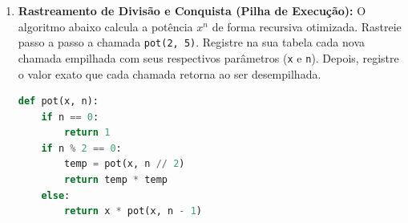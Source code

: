 \documentclass[10pt,a4paper]{article}
\begin{document}
\begin{enumerate}[leftmargin=*, itemsep=2pt, parsep=0pt, resume]
    \item \textbf{Rastreamento de Divisão e Conquista (Pilha de Execução):} O algoritmo abaixo calcula a potência $x^n$ de forma recursiva otimizada. Rastreie passo a passo a chamada \texttt{pot(2, 5)}. Registre na sua tabela cada nova chamada empilhada com seus respectivos parâmetros (\texttt{x} e \texttt{n}). Depois, registre o valor exato que cada chamada retorna ao ser desempilhada. 
\begin{lstlisting}[language=Python]
def pot(x, n):
    if n == 0:
        return 1
    if n % 2 == 0:
        temp = pot(x, n // 2)
        return temp * temp
    else:
        return x * pot(x, n - 1)
\end{lstlisting}

\end{enumerate}
\end{document}
